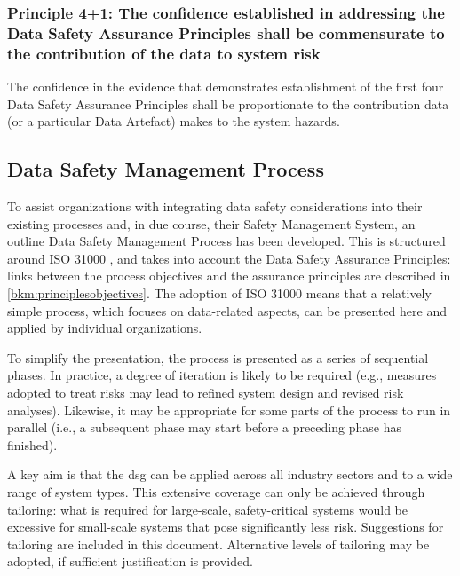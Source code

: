 \subsubsection{Principle 4+1: The confidence established in addressing the Data Safety Assurance Principles shall be commensurate to the contribution of the data to system risk}
The confidence in the evidence that demonstrates establishment of the first four Data Safety Assurance Principles shall be proportionate to the contribution data (or a particular Data Artefact) makes to the system hazards.

\subsection{Data Safety Management Process}
To assist organizations with integrating data safety considerations into their existing processes and, in due course, their Safety Management System, an outline Data Safety Management Process has been developed.
This is structured around
ISO 31000 \cite{citation:iso310002018risk},
and takes into account the Data Safety Assurance Principles: links between the process objectives and the assurance principles are described in \autoref{bkm:principlesobjectives}.
The adoption of ISO 31000 means that a relatively simple process, which focuses on data-related aspects, can be presented here and applied by individual organizations. 

To simplify the presentation, the process is presented as a series of sequential phases. In practice, a degree of iteration is likely to be required (e.g., measures adopted to treat risks may lead to refined system design and revised risk analyses). Likewise, it may be appropriate for some parts of the process to run in parallel (i.e., a subsequent phase may start before a preceding phase has finished).

A key aim is that the \gls{dsg} can be applied across all industry sectors and to a wide range of system types. This extensive coverage can only be achieved through tailoring: what is required for large-scale, safety-critical systems would be excessive for small-scale systems that pose significantly less risk. Suggestions for tailoring are included in this document. Alternative levels of tailoring may be adopted, if sufficient justification is provided.

